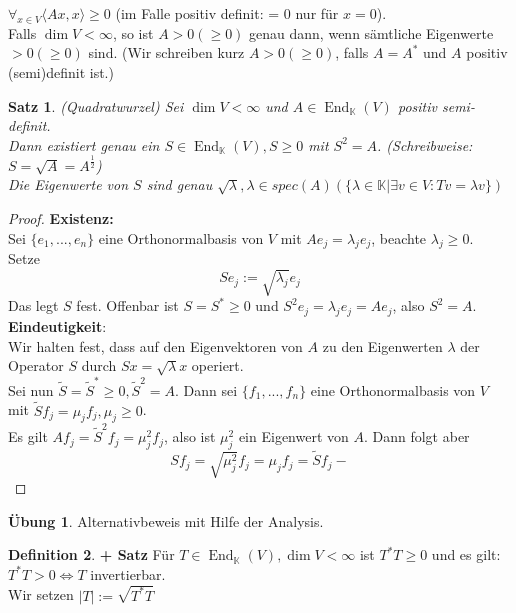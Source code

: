 \documentclass[12pt,a4paper]{article}
\newtheorem{theorem}{Satz}
\theoremstyle{definition}
\newtheorem{definition}[theorem]{Definition}
\newtheorem*{exercise}{Übung}
\theoremstyle{remark}
\DeclareMathOperator{\End}{End}
\begin{document}
	 $\forall_{x \in V} \langle Ax,x \rangle \geq 0$ (im Falle positiv definit: = 0 nur für $x=0$). \\
	Falls $\dim V<\infty$, so ist $A>0(\geq 0)$ genau dann, wenn sämtliche Eigenwerte $>0(\geq 0)$ sind. (Wir schreiben kurz $A >0 (\geq 0)$, falls $A=A^*$ und $A$ positiv (semi)definit ist.)
	\begin{theorem}{(Quadratwurzel)}
		Sei $\dim V <\infty$ und $A \in \End_{\mathbb{K}}(V)$ positiv semi-definit. \\
		Dann existiert genau ein $S \in \End_{\mathbb{K}}(V), S \geq 0$ mit $S^2=A$.
		(Schreibweise: $S = \sqrt{A}=A^{\frac{1}{2}}$) \\
		Die Eigenwerte von $S$ sind genau $\sqrt{\lambda}, \lambda \in spec(A)(\{\lambda \in \mathbb{K}| \exists v \in V: Tv = \lambda v \})$
	\end{theorem}
	\begin{proof}
		\textbf{Existenz:} \\	
		Sei $\{ e_1,...,e_n \}$ eine Orthonormalbasis von $V$ mit $Ae_j=\lambda_j e_j$, beachte $\lambda_j \geq 0$. \\
		Setze
		\begin{equation}
			Se_j := \sqrt{\lambda_j}e_j
		\end{equation}
		Das legt $S$ fest. Offenbar ist $S = S^* \geq 0$ und $S^2e_j = \lambda_je_j=Ae_j$, also $S^2 = A$. \\
		\textbf{Eindeutigkeit}: \\		
		Wir halten fest, dass auf den Eigenvektoren von $A$ zu den Eigenwerten $\lambda$ der Operator $S$ durch $Sx = \sqrt{\lambda}x$ operiert. \\
		Sei nun $\tilde{S} = \tilde{S}^* \geq 0, \tilde{S}^2=A$. Dann sei $\{ f_1,...,f_n \}$ eine Orthonormalbasis von $V$ mit $\tilde{S}f_j= \mu_jf_j, \mu_j \geq 0$. \\
		Es gilt $Af_j = \tilde{S}^2f_j = \mu_j^2f_j$, also ist $\mu_j^2$ ein Eigenwert von $A$.
		Dann folgt aber
		\begin{equation}
			Sf_j = \sqrt{\mu_j^2}f_j= \mu_jf_j = \tilde{S}f_j-
		\end{equation}
	\end{proof}
	\begin{exercise}
		Alternativbeweis mit Hilfe der Analysis.
	\end{exercise}
	\begin{definition}{\textbf{+ Satz}}
		Für $T \in \End_{\mathbb{K}}(V),\dim V < \infty$ ist $T^*T \geq 0$ und es gilt: \\
		$T^*T >0 \Leftrightarrow T$ invertierbar. \\
		Wir setzen $|T|:= \sqrt{T^*T}$
	\end{definition}
\end{document}
